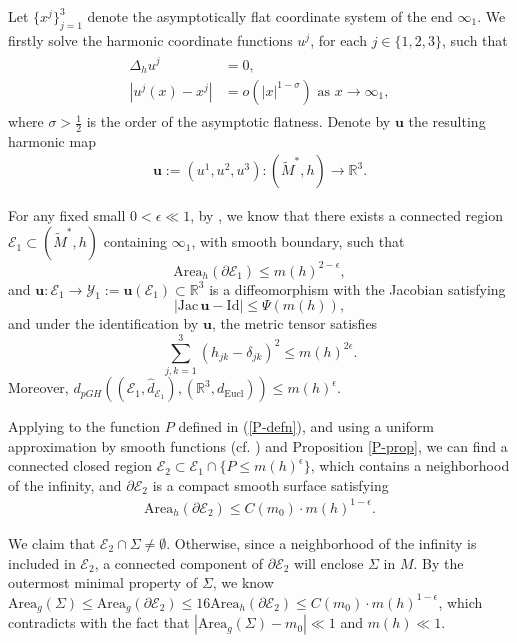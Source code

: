 \documentclass[letter]{amsart}
\theoremstyle{definition}
\theoremstyle{remark}
\begin{document}
Let $\{x^{j} \}_{j=1}^{3}$ denote the asymptotically flat coordinate system of the end $\infty_1$. We firstly solve the harmonic coordinate functions $u^j$, for each $j \in \{1,2,3\}$, such that 
\begin{align}
	\begin{split}
		\Delta _{h} u^j &=0,\\
		|u^j(x)- x^j| &= o(|x|^{1-\sigma }) \text{ as } x \to \infty_1,
	\end{split}
\end{align}
where $\sigma > \frac{1}{2}$ is the order of the asymptotic flatness. 
Denote by $\mathbf{u}$ the resulting harmonic map
\begin{align*}
	\mathbf{u}:= (u^1, u^2, u^3): (\tilde{M}^*, h) \to \mathbb{R}^3.
\end{align*}

For any fixed small $0< \epsilon \ll 1$, by \cite{DS'23}, we know that there exists a connected region $\mathcal{E}_1  \subset (\tilde{M}^*, h)$ containing $\infty_1$, with smooth boundary, such that 
$$
\mathrm{Area}_h(\partial \mathcal{E}_1) \leq m(h)^{2-\epsilon },
$$ and $\mathbf{u}: \mathcal{E}_1 \to \mathcal{Y}_1:= \mathbf{u}(\mathcal{E}_1) \subset \mathbb{R}^3$ is a diffeomorphism with the Jacobian satisfying 
$$
|\mathrm{Jac}\,\mathbf{u} - \mathrm{Id}| \leq \Psi (m(h) ),
$$
and under the identification by $\mathbf{u}$, the metric tensor satisfies
$$
\sum_{j,k=1}^{3}(h_{jk} - \delta_{jk})^2 \leq m(h)^{2 \epsilon }.
$$
Moreover, $d_{pGH}\left( (\mathcal{E}_1, \hat{d}_{\mathcal{E}_1}), (\mathbb{R}^3, d_{\mathrm{Eucl}}) \right) \leq m(h)^{\epsilon }$.

Applying \cite[Lemma 3.2, Lemma 3.3]{DS'23} to the function $P$ defined in (\ref{P-defn}), and using a uniform approximation by smooth functions (cf. \cite[Theorem 4.3]{EG15}) and Proposition \ref{P-prop}, we can find a connected closed region $\mathcal{E}_2 \subset \mathcal{E}_1 \cap \{P \leq m(h)^{\epsilon }\} $, which contains a neighborhood of the infinity, and $\partial \mathcal{E}_2$ is a compact smooth surface satisfying
\begin{align}
	\mathrm{Area}_h (\partial \mathcal{E}_2) \leq C(m_0)\cdot m(h)^{1- \epsilon }.
\end{align}

We claim that $\mathcal{E}_2 \cap \Sigma \neq \emptyset$. Otherwise, since a neighborhood of the infinity is included in $\mathcal{E}_2$, a connected component of $\partial \mathcal{E}_2$ will enclose $\Sigma $ in $M$. By the outermost minimal property of $\Sigma $, we know $\mathrm{Area}_g (\Sigma ) \leq \mathrm{Area}_g (\partial \mathcal{E}_2) \leq 16 \mathrm{Area}_h(\partial \mathcal{E}_2) \leq C(m_0)\cdot m(h)^{1-\epsilon }$, which contradicts with the fact that $|\mathrm{Area}_g (\Sigma ) - m_0| \ll 1$ and $m(h) \ll 1$.
\end{document}
